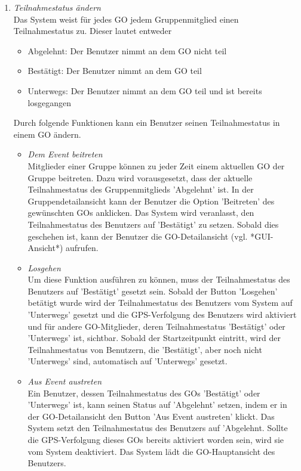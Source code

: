 \documentclass[parskip=full]{scrartcl}
\def\threedigits#1{%
  \ifnum#1<100 0\fi
  \ifnum#1<10 0\fi
  \number#1}
\begin{document}
\begin{enumerate}[label={\textbf{/F\protect\threedigits{\theenumi}0/}}, leftmargin=*, resume]
	\item \textit{Teilnahmestatus ändern}\label{Teilnahmestatus} \\
	Das System weist für jedes GO jedem Gruppenmitglied einen Teilnahmestatus zu. Dieser lautet entweder
	\begin{itemize}
		\item Abgelehnt: Der Benutzer nimmt an dem GO nicht teil
		\item Bestätigt: Der Benutzer nimmt an dem GO teil
		\item Unterwegs: Der Benutzer nimmt an dem GO teil und ist bereits losgegangen
	\end{itemize}
Durch folgende Funktionen kann ein Benutzer seinen Teilnahmestatus in einem GO ändern.

	\begin{itemize}
	\item \textit{Dem Event beitreten} \label{GO-Anfrage} \\
	Mitglieder einer Gruppe können zu jeder Zeit einem aktuellen GO der Gruppe beitreten. Dazu wird vorausgesetzt, dass der aktuelle Teilnahmestatus des Gruppenmitglieds 'Abgelehnt' ist. In der Gruppendetailansicht kann der Benutzer die Option 'Beitreten' des gewünschten GOs anklicken. Das System wird  veranlasst, den Teilnahmestatus des Benutzers auf 'Bestätigt' zu setzen. Sobald dies geschehen ist, kann der Benutzer die GO-Detailansicht (vgl. *GUI-Ansicht*) aufrufen.
	
	\item \textit{Losgehen} \\
	Um diese Funktion ausführen zu können, muss der Teilnahmestatus des Benutzers auf 'Bestätigt' gesetzt sein. Sobald der Button 'Losgehen' betätigt wurde wird der Teilnahmestatus des Benutzers vom System auf 'Unterwegs' gesetzt und die GPS-Verfolgung des Benutzers wird aktiviert und für andere GO-Mitglieder, deren Teilnahmestatus 'Bestätigt' oder 'Unterwegs' ist, sichtbar. Sobald der Startzeitpunkt eintritt, wird der Teilnahmestatus von Benutzern, die 'Bestätigt', aber noch nicht 'Unterwegs' sind, automatisch auf 'Unterwegs' gesetzt.
	
	\item \textit{Aus Event austreten} \\
Ein Benutzer, dessen Teilnahmestatus des GOs 'Bestätigt' oder 'Unterwegs' ist, kann seinen Status auf 'Abgelehnt' setzen, indem er in der GO-Detailansicht den Button 'Aus Event austreten' klickt. Das System setzt den Teilnahmestatus des Benutzers auf 'Abgelehnt. Sollte die GPS-Verfolgung dieses GOs bereits aktiviert worden sein, wird sie vom System deaktiviert. Das System lädt die GO-Hauptansicht des Benutzers.
	

\end{itemize}
\end{enumerate}
\end{document}
